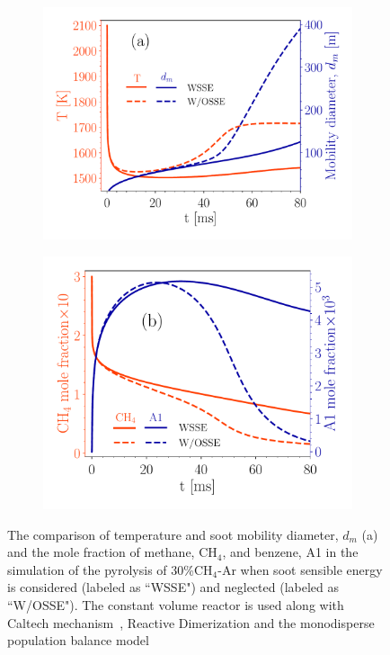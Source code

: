 \begin{figure}[H]
	\centering
	\begin{subfigure}[t]{0.43\textwidth}
		\includegraphics[width=1\textwidth]{Figures/Theory/sse_temp_dm.pdf}
	\end{subfigure}
	\begin{subfigure}[t]{0.4\textwidth}
		\includegraphics[width=1\textwidth]{Figures/Theory/sse_gasresid.pdf}
	\end{subfigure}
	\caption{The comparison of temperature and soot mobility diameter, $d_m$ (a) and the mole fraction of methane, $\mathrm{CH_4}$, and benzene, A1 in the simulation of the pyrolysis of 30\%$\mathrm{CH_4}$-Ar when soot sensible energy is considered (labeled as ``WSSE") and neglected (labeled as ``W/OSSE"). The constant volume reactor is used along with Caltech mechanism~\citep{blanquart2009chemical}, Reactive Dimerization and the monodisperse population balance model}
	\label{fig:sseeffect}
\end{figure}

